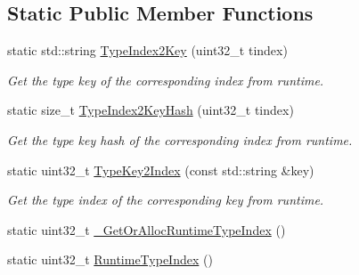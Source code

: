 \subsection*{Static Public Member Functions}
\begin{DoxyCompactItemize}
\item 
static std\+::string \hyperlink{classtvm_1_1runtime_1_1Object_a817ba6c23b7ee1821c48a75edf255a30}{Type\+Index2\+Key} (uint32\+\_\+t tindex)
\begin{DoxyCompactList}\small\item\em Get the type key of the corresponding index from runtime. \end{DoxyCompactList}\item 
static size\+\_\+t \hyperlink{classtvm_1_1runtime_1_1Object_a6ee32a02dd44257da105fbbe5d9c8622}{Type\+Index2\+Key\+Hash} (uint32\+\_\+t tindex)
\begin{DoxyCompactList}\small\item\em Get the type key hash of the corresponding index from runtime. \end{DoxyCompactList}\item 
static uint32\+\_\+t \hyperlink{classtvm_1_1runtime_1_1Object_a6841f97e06e6614dd7e82c6dd41b818a}{Type\+Key2\+Index} (const std\+::string \&key)
\begin{DoxyCompactList}\small\item\em Get the type index of the corresponding key from runtime. \end{DoxyCompactList}\item 
static uint32\+\_\+t \hyperlink{classtvm_1_1runtime_1_1Object_a5fbebc47be111ecc1d5869bcc0476e21}{\+\_\+\+Get\+Or\+Alloc\+Runtime\+Type\+Index} ()
\item 
static uint32\+\_\+t \hyperlink{classtvm_1_1runtime_1_1Object_ad94d79729ac85aa7c976e23d39066383}{Runtime\+Type\+Index} ()
\end{DoxyCompactItemize}

